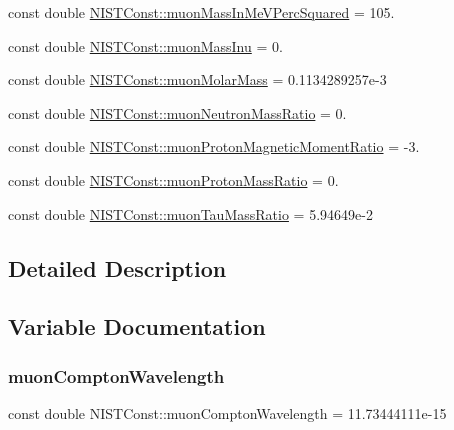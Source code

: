 \begin{DoxyCompactItemize}
\item 
const double \mbox{\hyperlink{group___n_i_s_t_const-_muon_ga781e348a83468d065630fd1b6da85eab}{N\+I\+S\+T\+Const\+::muon\+Mass\+In\+Me\+V\+Perc\+Squared}} = 105.
\item 
const double \mbox{\hyperlink{group___n_i_s_t_const-_muon_gaa24722892f878b56a8aa97cca27ed908}{N\+I\+S\+T\+Const\+::muon\+Mass\+Inu}} = 0.
\item 
const double \mbox{\hyperlink{group___n_i_s_t_const-_muon_ga9211251167ca5318354df60b44939e60}{N\+I\+S\+T\+Const\+::muon\+Molar\+Mass}} = 0.\+1134289257e-\/3
\item 
const double \mbox{\hyperlink{group___n_i_s_t_const-_muon_ga8f63813d3e0283a611f3e66b6d0b681d}{N\+I\+S\+T\+Const\+::muon\+Neutron\+Mass\+Ratio}} = 0.
\item 
const double \mbox{\hyperlink{group___n_i_s_t_const-_muon_gae49d53271e3ee71dc74d718028782d06}{N\+I\+S\+T\+Const\+::muon\+Proton\+Magnetic\+Moment\+Ratio}} = -\/3.
\item 
const double \mbox{\hyperlink{group___n_i_s_t_const-_muon_ga72ca5408215ae40bb36ef1bff9107cf7}{N\+I\+S\+T\+Const\+::muon\+Proton\+Mass\+Ratio}} = 0.
\item 
const double \mbox{\hyperlink{group___n_i_s_t_const-_muon_gaaf24aa0c43f6d4a1935963fdd4c44789}{N\+I\+S\+T\+Const\+::muon\+Tau\+Mass\+Ratio}} = 5.\+94649e-\/2
\end{DoxyCompactItemize}


\subsection{Detailed Description}


\subsection{Variable Documentation}
\mbox{\label{group___n_i_s_t_const-_muon_ga344399a1ac3bc2f57614ccdca4f4f1c1}} 
\subsubsection{\texorpdfstring{muon\+Compton\+Wavelength}{muonComptonWavelength}}
{\footnotesize\ttfamily const double N\+I\+S\+T\+Const\+::muon\+Compton\+Wavelength = 11.\+73444111e-\/15}

